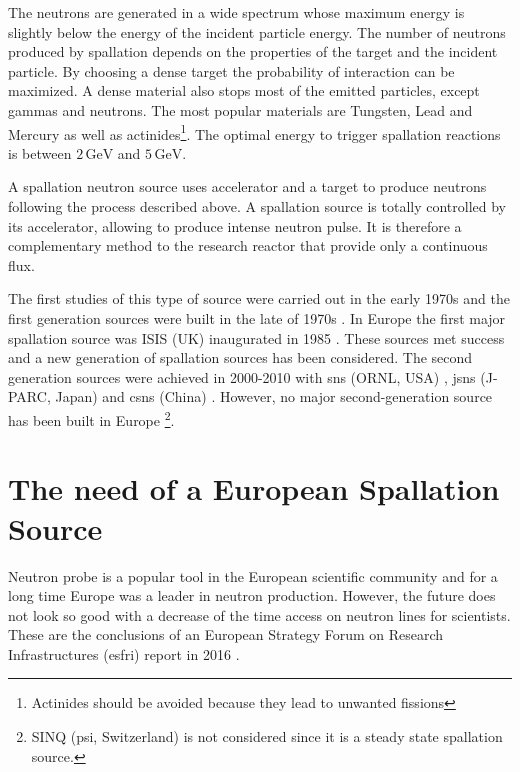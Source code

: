 \begin{refsection}
  The neutrons are generated in a wide spectrum whose maximum energy is slightly below the energy of the incident particle energy. The number of neutrons produced by spallation depends on the properties of the target and the incident particle. By choosing a dense target the probability of interaction can be maximized. A dense material also stops most of the emitted particles, except gammas and neutrons. The most popular materials are Tungsten, Lead and Mercury as well as actinides\footnote{Actinides should be avoided because they lead to unwanted fissions}. The optimal energy to trigger spallation reactions is between $2\,\mathrm{GeV}$ and $5\,\mathrm{GeV}$.

  A spallation neutron source uses accelerator and a target to produce neutrons following the process described above. A spallation source is totally controlled by its accelerator, allowing to produce intense neutron pulse. It is therefore a complementary method to the research reactor that provide only a continuous flux.

  The first studies of this type of source were carried out in the early 1970s and the first generation sources were built in the late of 1970s \cite{klein1994}. In Europe the first major spallation source was ISIS (UK) inaugurated in 1985 \cite{THOMASON201961}. These sources met success and a new generation of spallation sources has been considered. The second generation sources were achieved in 2000-2010 with \acrshort{sns} (ORNL, USA) \cite{Mason2005}, \acrshort{jsns} (J-PARC, Japan) \cite{Ikeda2002} and \acrshort{csns} (China) \cite{Chen2016}. However, no major second-generation source has been built in Europe \footnote{SINQ \cite{WAGNER2006541} (\acrshort{psi}, Switzerland) is not considered since it is a steady state spallation source.}.

  

  \section{The need of a European Spallation Source}
  \label{ch1:Summary}
  Neutron probe is a popular tool in the European scientific community and for a long time Europe was a leader in neutron production. However, the future does not look so good with a decrease of the time access on neutron lines for scientists. These are the conclusions of an European Strategy Forum on Research Infrastructures (\acrshort{esfri}) report in 2016 \cite{neutron2016}.


\end{refsection}
